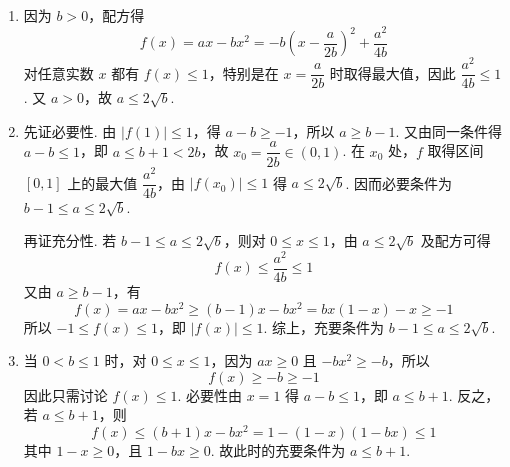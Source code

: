 \begin{solution}
\begin{enumerate}
\item 因为 \(b>0\)，配方得
\[
f(x)=ax-bx^2=-b\left(x-\frac{a}{2b}\right)^2+\frac{a^2}{4b}
\]
对任意实数 \(x\) 都有 \(f(x)\leqslant1\)，特别是在 \(x=\dfrac{a}{2b}\) 时取得最大值，因此 \(\dfrac{a^2}{4b}\leqslant1\). 又 \(a>0\)，故 \(a\leqslant2\sqrt b\).

\item 先证必要性. 由 \(|f(1)|\leqslant1\)，得 \(a-b\geqslant-1\)，所以 \(a\geqslant b-1\). 又由同一条件得 \(a-b\leqslant1\)，即 \(a\leqslant b+1<2b\)，故 \(x_0=\dfrac{a}{2b}\in(0,1)\). 在 \(x_0\) 处，\(f\) 取得区间 \([0,1]\) 上的最大值 \(\dfrac{a^2}{4b}\)，由 \(|f(x_0)|\leqslant1\) 得 \(a\leqslant2\sqrt b\). 因而必要条件为 \(b-1\leqslant a\leqslant2\sqrt b\).

再证充分性. 若 \(b-1\leqslant a\leqslant2\sqrt b\)，则对 \(0\leqslant x\leqslant1\)，由 \(a\leqslant2\sqrt b\) 及配方可得
\[
f(x)\leqslant\frac{a^2}{4b}\leqslant1
\]
又由 \(a\geqslant b-1\)，有
\[
f(x)=ax-bx^2\geqslant(b-1)x-bx^2=bx(1-x)-x\geqslant-1
\]
所以 \(-1\leqslant f(x)\leqslant1\)，即 \(|f(x)|\leqslant1\). 综上，充要条件为 \(b-1\leqslant a\leqslant2\sqrt b\).

\item 当 \(0<b\leqslant1\) 时，对 \(0\leqslant x\leqslant1\)，因为 \(ax\geqslant0\) 且 \(-bx^2\geqslant-b\)，所以
\[
f(x)\geqslant-b\geqslant-1
\]
因此只需讨论 \(f(x)\leqslant1\). 必要性由 \(x=1\) 得 \(a-b\leqslant1\)，即 \(a\leqslant b+1\). 反之，若 \(a\leqslant b+1\)，则
\[
f(x)\leqslant(b+1)x-bx^2=1-(1-x)(1-bx)\leqslant1
\]
其中 \(1-x\geqslant0\)，且 \(1-bx\geqslant0\). 故此时的充要条件为 \(a\leqslant b+1\).
\end{enumerate}
\end{solution}
